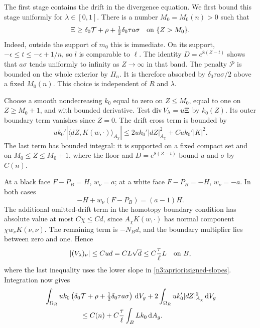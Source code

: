 The first stage contains the drift in the divergence equation. We first
bound this stage uniformly for $\lambda\in[0,1]$.
There is a number $M_0=M_0(n)>0$ such that
\begin{equation}
 \Xi\ge\delta_0\mathcal T+\rho+
                      \tfrac12\delta_0\tau a\sigma
          \quad\hbox{on }\{Z>M_0\}.
 \label{n3:apriori:high-source}
\end{equation}
Indeed, outside the support of $m_0$ this is immediate.  On its
support, $-\epsilon\le t\le-\epsilon+1/n$, so $l$ is comparable
to $\ell$.  The identity $D=e^{8(Z-t)}$ shows that $a\sigma$ tends
uniformly to infinity as $Z\to\infty$ in that band.  The penalty
$\mathcal P$ is bounded on the whole exterior by $\Pi_n$.
It is therefore absorbed by $\delta_0\tau a\sigma/2$ above a fixed
$M_0(n)$.  This choice is independent of $R$ and $\lambda$.

Choose a smooth nondecreasing $k_0$ equal to zero on $Z\le M_0$,
equal to one on $Z\ge M_0+1$, and with bounded derivative.  Test
$\operatorname{div} V_\lambda=u\Xi$ by $k_0(Z)$.  Its outer boundary term
vanishes since $Z=0$.  The drift cross term is bounded by
\[
 u k_0'\left|\langle dZ,K(w,\cdot)\rangle_{A_\chi}\right|
 \le 2u k_0'|dZ|_{A_\chi}^2+C u k_0'|K|^2.
\]
The last term has bounded integral: it is supported on a fixed
compact set and on $M_0\le Z\le M_0+1$, where the floor and
$D=e^{8(Z-t)}$ bound $u$ and $\sigma$ by $C(n)$.

At a black face $F-P_B=H$, $w_\nu=a$; at a white face
$F-P_B=-H$, $w_\nu=-a$.  In both cases
\[
 -H+w_\nu(F-P_B)=(a-1)H.
\]
The additional omitted-drift term in the homotopy boundary condition
has absolute value at most $C\chi\le Cd$, since
$A_\chi K(w,\cdot)$ has normal component
$\chi w_\nu K(\nu,\nu)$.  The remaining term is $-N_Bd$, and the
boundary multiplier lies between zero and one.  Hence
\begin{equation}
 |(V_\lambda)_\nu|\le Cud=CL\sqrt d
                       \le C\frac\tau\ell L\quad\hbox{on }B,
 \label{n3:apriori:small-boundary-flux}
\end{equation}
where the last inequality uses the lower slope in
\eqref{n3:apriori:signed-slopes}.  Integration now gives
\begin{align}
 &\int_{\Omega_R}u k_0
       \left(\delta_0\mathcal T+\rho+
                      \tfrac12\delta_0\tau a\sigma\right)\dd V_g
       +2\int_{\Omega_R}u k_0'|dZ|_{A_\chi}^2\dd V_g\notag\\
 &\hspace{18mm}\le C(n)+C\frac\tau\ell
                                  \int_B Lk_0\dd A_g.
 \label{n3:apriori:high-energy-before-trace}
\end{align}

